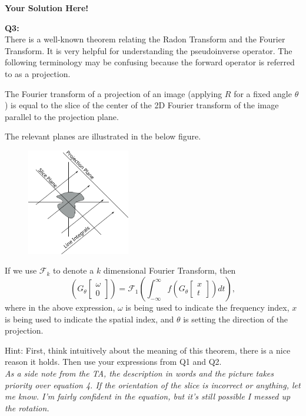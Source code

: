 \documentclass[12pt]{article}
\newcommand{\0}{\mathbf{0}}
\newcommand{\1}{\mathbf{1}}
\newcommand{\solspace}{\vspace{3mm} \textbf{Your Solution Here!} \vspace{3mm}}
\begin{document}
\solspace

\textbf{Q3:}\\
There is a well-known theorem relating the Radon Transform and the Fourier Transform. It is very helpful for understanding the pseudoinverse operator.
The following terminology may be confusing because the forward operator is referred to as a projection.

The Fourier transform of a projection of an image (applying $R$ for a fixed angle $\theta$) is equal to the slice of the center of the 2D Fourier transform of the image parallel to the projection plane.

The relevant planes are illustrated in the below figure.
\begin{figure}[h]
    \centering
    \includegraphics[width=0.4\textwidth]{ProjectionSlice.png}
\end{figure}

If we use $\mathcal{F}_k$ to denote a $k$ dimensional Fourier Transform, then
\begin{equation}
    [\mathcal{F}_2(f)]\left(G_\theta\begin{bmatrix}
        \omega \\ 0
    \end{bmatrix}\right) = 
    \mathcal{F}_1\left(\int_{-\infty}^{\infty}f\left(G_\theta\begin{bmatrix}
		x \\ t
	\end{bmatrix}\right) dt\right),
\end{equation}
where in the above expression, $\omega$ is being used to indicate the frequency index, $x$ is being used to indicate the spatial index, and $\theta$ is setting the direction of the projection.

Hint: First, think intuitively about the meaning of this theorem, there is a nice reason it holds. Then use your expressions from Q1 and Q2. \\
\textit{As a side note from the TA, the description in words and the picture takes priority over equation 4. If the orientation of the slice is incorrect or anything, let me know.
I'm fairly confident in the equation, but it's still possible I messed up the rotation.}
\end{document}
